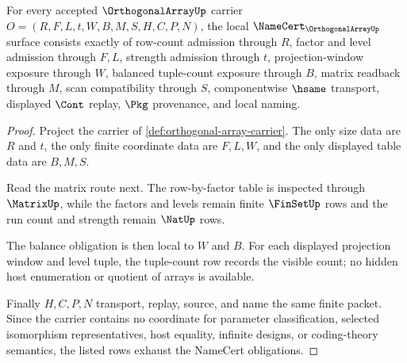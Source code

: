 \begin{theorem}
\label{thm:orthogonal-array-namecert-obligations}
For every accepted $\OrthogonalArrayUp$ carrier $O=(R,F,L,t,W,B,M,S,H,C,P,N)$, the local $\NameCert_{\OrthogonalArrayUp}$ surface consists exactly of row-count admission through $R$, factor and level admission through $F,L$, strength admission through $t$, projection-window exposure through $W$, balanced tuple-count exposure through $B$, matrix readback through $M$, scan compatibility through $S$, componentwise $\hsame$ transport, displayed $\Cont$ replay, $\Pkg$ provenance, and local naming.
\end{theorem}
\begin{proof}
Project the carrier of \autoref{def:orthogonal-array-carrier}. The only size data are $R$ and $t$, the only finite coordinate data are $F,L,W$, and the only displayed table data are $B,M,S$.

Read the matrix route next. The row-by-factor table is inspected through $\MatrixUp$, while the factors and levels remain finite $\FinSetUp$ rows and the run count and strength remain $\NatUp$ rows.

The balance obligation is then local to $W$ and $B$. For each displayed projection window and level tuple, the tuple-count row records the visible count; no hidden host enumeration or quotient of arrays is available.

Finally $H,C,P,N$ transport, replay, source, and name the same finite packet. Since the carrier contains no coordinate for parameter classification, selected isomorphism representatives, host equality, infinite designs, or coding-theory semantics, the listed rows exhaust the NameCert obligations.
\end{proof}

